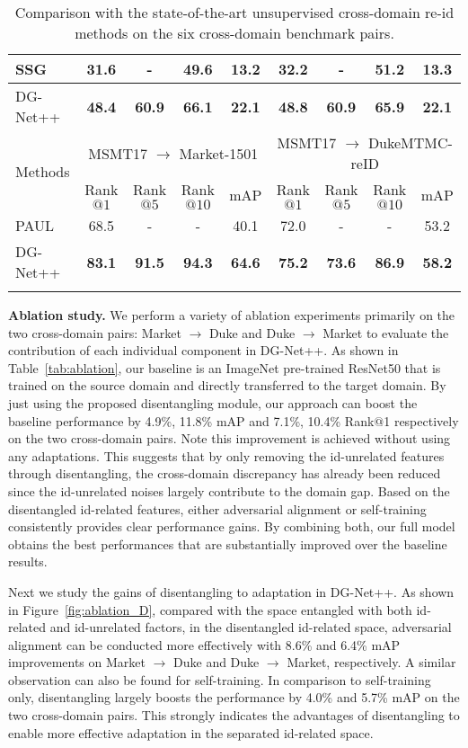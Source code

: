 \documentclass[runningheads]{llncs}
\begin{document}
\begin{table}[t]
\begin{tabular*}{\linewidth}{l|cccc|cccc}
 SSG \cite{Fu_2019_ICCV} & 31.6 & - & 49.6 & 13.2 & 32.2 & - & 51.2 & 13.3 \\ \hline
DG-Net++ & \textbf{48.4} & \textbf{60.9} & \textbf{66.1} & \textbf{22.1} & \textbf{48.8} & \textbf{60.9} & \textbf{65.9} & \textbf{22.1} \\ \hline \hline
\multirow{2}{*}{Methods} & \multicolumn{4}{c|}{MSMT17 $\rightarrow$ Market-1501}  & \multicolumn{4}{c}{MSMT17 $\rightarrow$ DukeMTMC-reID}\\
 & Rank$@1$ & Rank$@5$ & Rank$@10$ & mAP & Rank$@1$ & Rank$@5$ & Rank$@10$ & mAP \\ \hline
PAUL \cite{yang2019patch} & 68.5 & - & - & 40.1 & 72.0 & - & - & 53.2 \\ \hline
DG-Net++ & \textbf{83.1} & \textbf{91.5} & \textbf{94.3} & \textbf{64.6} & \textbf{75.2} & \textbf{73.6} & \textbf{86.9} & \textbf{58.2} \\
\shline
\end{tabular*}
\vspace{1mm}
\caption{Comparison with the state-of-the-art unsupervised cross-domain re-id methods on the six cross-domain benchmark pairs.}
\vspace{-8pt}
\label{tab:du2ma}
\end{table}

\noindent\textbf{Ablation study.} We perform a variety of ablation experiments primarily on the two cross-domain pairs: Market $\rightarrow$ Duke and Duke $\rightarrow$ Market to evaluate the contribution of each individual component in DG-Net++. As shown in Table~\ref{tab:ablation}, our baseline is an ImageNet pre-trained ResNet50 that is trained on the source domain and directly transferred to the target domain. By just using the proposed disentangling module, our approach can boost the baseline performance by 4.9\%, 11.8\% mAP and 7.1\%, 10.4\% Rank$@$1 respectively on the two cross-domain pairs. Note this improvement is achieved without using any adaptations. This suggests that by only removing the id-unrelated features through disentangling, the cross-domain discrepancy has already been reduced since the id-unrelated noises largely contribute to the domain gap. 
Based on the disentangled id-related features, either adversarial alignment or self-training consistently provides clear performance gains. By combining both, our full model obtains the best performances that are substantially improved over the baseline results. 

Next we study the gains of disentangling to adaptation in DG-Net++. As shown in Figure~\ref{fig:ablation_D}, compared with the space entangled with both id-related and id-unrelated factors, in the disentangled id-related space, adversarial alignment can be conducted more effectively with 8.6\% and 6.4\% mAP improvements on Market $\rightarrow$ Duke and Duke $\rightarrow$ Market, respectively. A similar observation can also be found for self-training. In comparison to self-training only, disentangling largely boosts the performance by 4.0\% and 5.7\% mAP on the two cross-domain pairs. This strongly indicates the advantages of disentangling to enable more effective adaptation in the separated id-related space.
\end{document}
